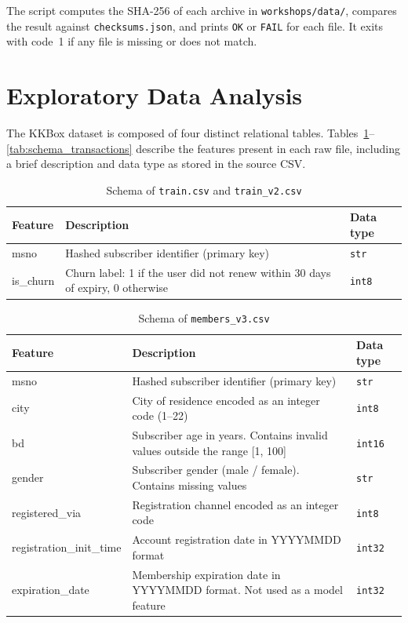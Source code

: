 \documentclass{article}
\begin{document}
The script computes the SHA-256 of each archive in \texttt{workshops/data/}, compares the result against \texttt{checksums.json}, and prints \texttt{OK} or \texttt{FAIL} for each file. It exits with code~1 if any file is missing or does not match.

\section{Exploratory Data Analysis}

The KKBox dataset is composed of four distinct relational tables. Tables~\ref{tab:schema_train}--\ref{tab:schema_transactions} describe the features present in each raw file, including a brief description and data type as stored in the source CSV.

\begin{table}[H]
\centering
\renewcommand{\arraystretch}{1.3}
\begin{tabularx}{\textwidth}{|l|X|l|}
\hline
\textbf{Feature} & \textbf{Description} & \textbf{Data type} \\ \hline
msno      & Hashed subscriber identifier (primary key) & \texttt{str} \\ \hline
is\_churn & Churn label: 1 if the user did not renew within 30 days of expiry, 0 otherwise & \texttt{int8} \\ \hline
\end{tabularx}
\caption{Schema of \texttt{train.csv} and \texttt{train\_v2.csv}}
\label{tab:schema_train}
\end{table}

\begin{table}[H]
\centering
\renewcommand{\arraystretch}{1.3}
\begin{tabularx}{\textwidth}{|l|X|l|}
\hline
\textbf{Feature} & \textbf{Description} & \textbf{Data type} \\ \hline
msno                     & Hashed subscriber identifier (primary key) & \texttt{str} \\ \hline
city                     & City of residence encoded as an integer code (1--22) & \texttt{int8} \\ \hline
bd                       & Subscriber age in years. Contains invalid values outside the range [1, 100] & \texttt{int16} \\ \hline
gender                   & Subscriber gender (male / female). Contains missing values & \texttt{str} \\ \hline
registered\_via          & Registration channel encoded as an integer code & \texttt{int8} \\ \hline
registration\_init\_time & Account registration date in YYYYMMDD format & \texttt{int32} \\ \hline
expiration\_date         & Membership expiration date in YYYYMMDD format. Not used as a model feature & \texttt{int32} \\ \hline
\end{tabularx}
\caption{Schema of \texttt{members\_v3.csv}}
\label{tab:schema_members}
\end{table}
\end{document}
